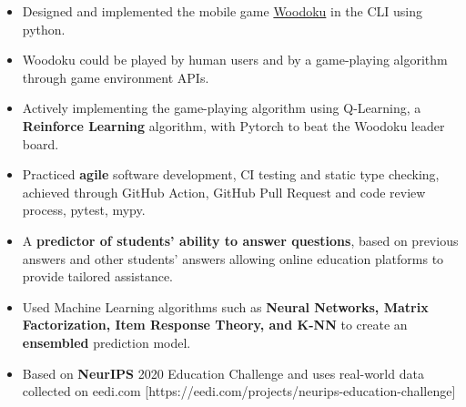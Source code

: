 \documentclass[10pt,a4paper,ragged2e,withhyper]{altacv}
\begin{document}
\begin{paracol}{2}
\switchcolumn{}




\begin{itemize}
  \item Designed and implemented the mobile game \href{https://play.google.com/store/apps/details?id=com.tripledot.woodoku&hl=en_CA&gl=US}{Woodoku} in the CLI using python.
  \item Woodoku could be played by human users and by a game-playing algorithm through game environment APIs. 
  \item Actively implementing the game-playing algorithm using Q-Learning, a \textbf{Reinforce Learning} algorithm, with Pytorch to beat the Woodoku leader board.
  \item Practiced \textbf{agile} software development, CI testing and static type checking, achieved through GitHub Action, GitHub Pull Request and code review process, pytest, mypy.  
\end{itemize}

\divider{}
\vspace{-2pt}

\begin{itemize}
    \item A \textbf{predictor of students' ability to answer questions}, based on previous answers and other students' answers allowing online education platforms to provide tailored assistance.
    \item Used Machine Learning algorithms such as \textbf{Neural Networks, Matrix Factorization, Item Response Theory, and K-NN} to create an \textbf{ensembled} prediction model.
    \item Based on \textbf{NeurIPS} 2020 Education Challenge and uses real-world data collected on  \printinfo{\faGlobe} {eedi.com} [https://eedi.com/projects/neurips-education-challenge] 

\end{itemize}


\end{paracol}
\end{document}
